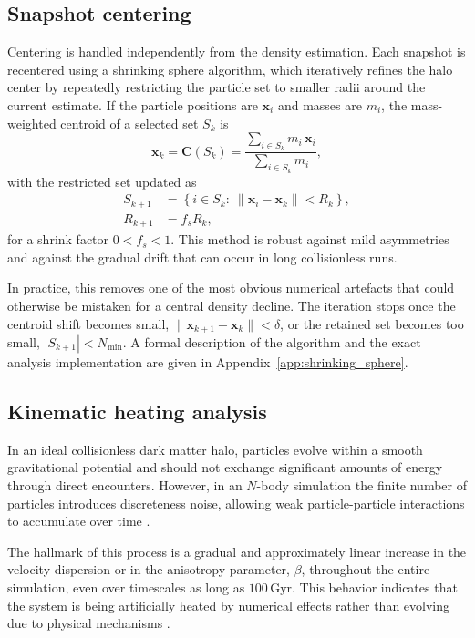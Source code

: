 \subsection{Snapshot centering}
Centering is handled independently from the density estimation. Each snapshot is recentered using a shrinking sphere algorithm, which iteratively refines the halo center by repeatedly restricting the particle set to smaller radii around the current estimate. If the particle positions are $\mathbf{x}_i$ and masses are $m_i$, the mass-weighted centroid of a selected set $S_k$ is
\begin{equation}
\mathbf{x}_k = \mathbf{C}(S_k) = \frac{\sum_{i\in S_k} m_i\,\mathbf{x}_i}{\sum_{i\in S_k} m_i},
\end{equation}
with the restricted set updated as
\begin{align}
S_{k+1} &= \left\{i\in S_k:\ \|\mathbf{x}_i-\mathbf{x}_k\| < R_k\right\}, \\
R_{k+1} &= f_s R_k,
\end{align}
for a shrink factor $0<f_s<1$.
This method is robust against mild asymmetries and against the gradual drift that can occur in long collisionless runs.

In practice, this removes one of the most obvious numerical artefacts that could otherwise be mistaken for a central density decline. The iteration stops once the centroid shift becomes small, $\|\mathbf{x}_{k+1}-\mathbf{x}_k\|<\delta$, or the retained set becomes too small, $|S_{k+1}|<N_{\min}$. A formal description of the algorithm and the exact analysis implementation are given in Appendix~\ref{app:shrinking_sphere}.

\subsection{Kinematic heating analysis}

In an ideal collisionless dark matter halo, particles evolve within a smooth gravitational potential and should not exchange significant amounts of energy through direct encounters. However, in an $N$-body simulation the finite number of particles introduces discreteness noise, allowing weak particle-particle interactions to accumulate over time \citep{power2003inner, diemand2004relaxation}.

The hallmark of this process is a gradual and approximately linear increase in the velocity dispersion or in the anisotropy parameter, $\beta$, throughout the entire simulation, even over timescales as long as $100\,\mathrm{Gyr}$. This behavior indicates that the system is being artificially heated by numerical effects rather than evolving due to physical mechanisms \citep{diemand2004relaxation}.

